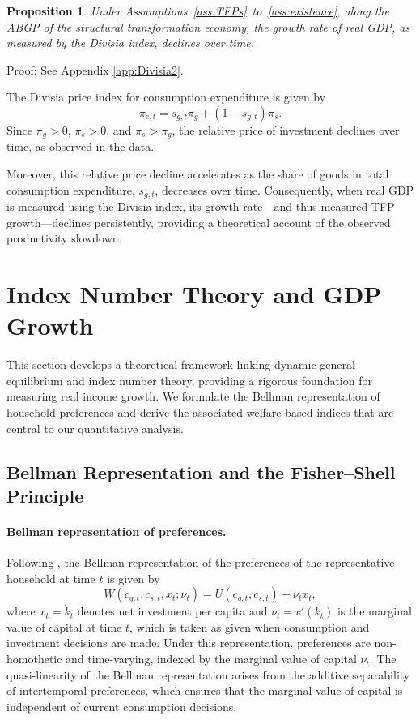 \documentclass[12pt,a4paper]{article}
\newtheorem{proposition}{Proposition}
\begin{document}
\begin{proposition}\label{prop:Divisia}
Under Assumptions~\ref{ass:TFPs}~to~\ref{ass:existence}, along the ABGP of the structural transformation economy, the growth rate of real GDP, as measured by the Divisia index, declines over time.
\end{proposition} 

\noindent 
{\sc Proof:} See Appendix \ref{app:Divisia2}. 

The Divisia price index for consumption expenditure is given by
\[
\pi_{e,t} = s_{g,t} \pi_g + (1 - s_{g,t}) \pi_s .
\]
Since \( \pi_g > 0 \), \( \pi_s > 0 \), and \( \pi_s > \pi_g \), the relative price of investment declines over time, as observed in the data. 

Moreover, this relative price decline accelerates as the share of goods in total consumption expenditure, \( s_{g,t} \), decreases over time. 
Consequently, when real GDP is measured using the Divisia index, its growth rate—and thus measured TFP growth—declines persistently, providing a theoretical account of the observed productivity slowdown.

\section{Index Number Theory and GDP Growth}\label{sec:INT}

\noindent This section develops a theoretical framework linking dynamic general equilibrium and index number theory, providing a rigorous foundation for measuring real income growth. We formulate the Bellman representation of household preferences and derive the associated welfare-based indices that are central to our quantitative analysis.

\subsection{Bellman Representation and the Fisher–Shell Principle}

\paragraph{Bellman representation of preferences.}

Following \cite{duran_licandro_2024}, the Bellman representation of the preferences of the representative household at time \( t \) is given by
\begin{equation}\label{eq:BR}
W(c_{g,t}, c_{s,t}, x_t; \nu_t) = U(c_{g,t}, c_{s,t}) + \nu_t x_t,
\end{equation}
where \( x_t = \dot{k}_t \) denotes net investment per capita and \( \nu_t = v'(k_t) \) is the marginal value of capital at time \( t \), which is taken as given when consumption and investment decisions are made.  
Under this representation, preferences are non-homothetic and time-varying, indexed by the marginal value of capital \( \nu_t \).  
The quasi-linearity of the Bellman representation arises from the additive separability of intertemporal preferences, which ensures that the marginal value of capital is independent of current consumption decisions.
\end{document}
